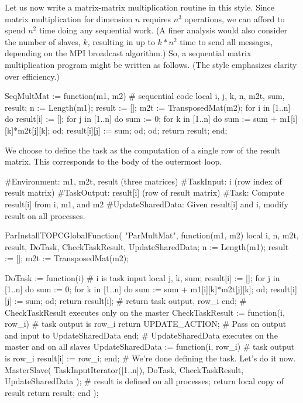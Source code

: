 Let us now write a matrix-matrix
multiplication routine in this style.  Since matrix multiplication for
dimension $n$ requires $n^3$ operations, we can afford to spend $n^2$ time
doing any sequential work.  (A finer analysis would also consider the
number of slaves, $k$, resulting in up to $k*n^2$ time to send all
messages, depending on the MPI broadcast algorithm.)  So, a sequential
matrix multiplication program might be written as follows.  (The style
emphasizes clarity over efficiency.)


\beginexample
SeqMultMat := function(m1, m2)               # sequential code
  local i, j, k, n, m2t, sum, result;
  n := Length(m1);
  result := [];
  m2t := TransposedMat(m2);
  for i in [1..n] do
    result[i] := [];
    for j in [1..n] do
      sum := 0;
      for k in [1..n] do
        sum := sum + m1[i][k]*m2t[j][k];
      od;
      result[i][j] := sum;
    od;
  od;
  return result;
end;
\endexample

We choose to define the task as the computation of a single row of the
result matrix.  This corresponds to the body of the outermost loop.


\beginexample
#Environment: m1, m2t, result (three matrices)
#TaskInput:   i (row index of result matrix)
#TaskOutput:  result[i] (row of result matrix)
#Task:        Compute result[i] from i, m1, and m2
#UpdateSharedData:  Given result[i] and i, modify result on all processes.

ParInstallTOPCGlobalFunction( "ParMultMat", function(m1, m2)
  local i, n, m2t, result, DoTask, CheckTaskResult, UpdateSharedData;
  n := Length(m1);
  result := [];
  m2t := TransposedMat(m2);

  DoTask := function(i) # i is task input
    local j, k, sum;
    result[i] := [];
    for j in [1..n] do
      sum := 0;
      for k in [1..n] do
        sum := sum + m1[i][k]*m2t[j][k];
      od;
      result[i][j] := sum;
    od;
    return result[i]; # return task output, row_i
  end;
  # CheckTaskResult executes only on the master
  CheckTaskResult := function(i, row_i) # task output is row_i
    return UPDATE_ACTION; # Pass on output and input to UpdateSharedData
  end;
  # UpdateSharedData executes on the master and on all slaves
  UpdateSharedData := function(i, row_i) # task output is row_i
    result[i] := row_i;
  end;
  # We're done defining the task.  Let's do it now.
  MasterSlave( TaskInputIterator([1..n]), DoTask, CheckTaskResult,
               UpdateSharedData );
  # result is defined on all processes;  return local copy of result
  return result;
end );
\endexample

